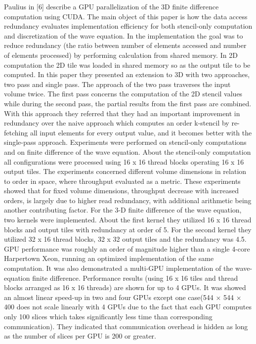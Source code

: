 Paulius in [6] describe a GPU parallelization of the 3D finite difference computation using CUDA. The main object of this paper is how the data access redundancy evaluates implementation efficiency for both stencil-only computation and discretization of the wave equation. In the implementation the goal was to reduce redundancy (the ratio between number of elements accessed and number of elements processed) by performing calculation from shared memory. In 2D computation the 2D tile was loaded in shared memory so as the output tile to be computed. In this paper they presented an extension to 3D with two approaches, two pass and single pass. The approach of the two pass traverses the input volume twice. The first pass concerns the computation of the 2D stencil values while during the second pass, the partial results from the first pass are combined. With this approach they referred that they had an important improvement in redundancy over the naive approach which computes an order k-stencil by re-fetching all input elements for every output value, and it becomes better with the single-pass approach. Experiments were performed on stencil-only computations and on finite difference of the wave equation. About the stencil-only computation all configurations were processed using 16 x 16 thread blocks operating 16 x 16 output tiles. The experiments concerned different volume dimensions in relation to order in space, where throughput evaluated as a metric. These experiments showed that for fixed volume dimensions, throughput decrease with increased orders, is largely due to higher read redundancy, with additional arithmetic being another contributing factor. For the 3-D finite difference of the wave equation, two kernels were implemented. About the first kernel they utilized 16 x 16 thread blocks and output tiles with redundancy at order of 5. For the second kernel they utilized 32 x 16 thread blocks, 32 x 32 output tiles and the redundancy was 4.5. GPU performance was roughly an order of magnitude higher than a single 4-core Harpertown Xeon, running an optimized implementation of the same computation. It was also demonstrated a multi-GPU implementation of the wave-equation finite difference. Performance results (using 16 x 16 tiles and thread blocks arranged as 16 x 16 threads) are shown for up to 4 GPUs. It was showed an almost linear speed-up in two and four GPUs except one case(544 × 544 × 400 does not scale linearly with 4 GPUs due to the fact that each GPU computes only 100 slices which takes significantly less time than corresponding communication). They indicated that communication overhead is hidden as long as the number of slices per GPU is 200 or greater.

